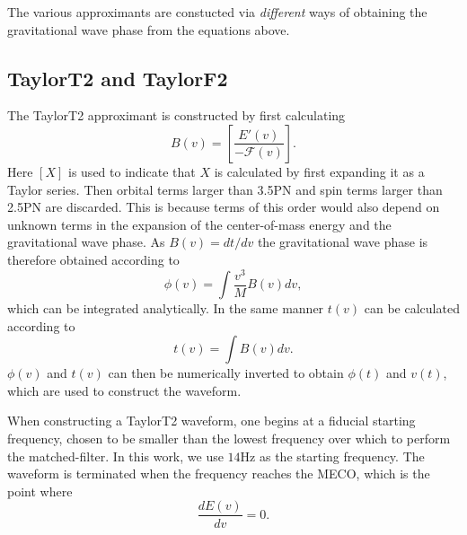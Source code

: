The various approximants are constucted via \emph{different} ways of
obtaining the gravitational wave phase from the equations above.

\subsection{TaylorT2 and TaylorF2}
\label{ssec:taylort2}

The TaylorT2 approximant is constructed by first calculating
%
\begin{equation}\label{eq:t2}
 B(v) = \left[ \frac{E'(v)}{-\mathcal{F}(v)} \right].
\end{equation}
%
Here $[X]$ is used to indicate that $X$ is calculated by first expanding it
as a Taylor series. Then orbital terms larger
than 3.5\ac{PN} and spin terms larger than 2.5\ac{PN} are discarded. This is 
because terms of this order would also depend on unknown terms in the 
expansion of the center-of-mass energy and the gravitational wave phase.
As $B(v) = dt / dv$ the gravitational wave phase is therefore obtained 
according to
%
\begin{equation}\label{eq:phaset2}
\phi(v) = \int \frac{v^3}{M} B(v) dv,
\end{equation}
%
which can be integrated analytically. In the same manner $t(v)$ can be 
calculated according to
%
\begin{equation}
 t(v) = \int B(v) dv.
\end{equation}
%
$\phi(v)$ and $t(v)$ can then be numerically inverted to obtain $\phi(t)$ and 
$v(t)$, which are used to construct the waveform.

When constructing a TaylorT2 waveform, one begins at a fiducial 
starting frequency, chosen to be smaller than the lowest frequency over which to 
perform the matched-filter. In this work, we use $14$Hz as the starting 
frequency. The waveform is terminated when the frequency reaches the 
\ac{MECO}, which is the point where
%
\begin{equation}
\frac{dE(v)}{dv} = 0.
\end{equation}

